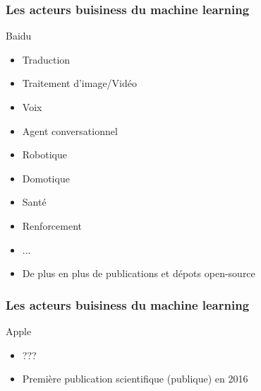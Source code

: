 \documentclass{formation}
\begin{document}
\begin{frame}
  \frametitle{Les acteurs buisiness du machine learning}
  Baidu
  \begin{itemize}
  \item Traduction
  \item Traitement d'image/Vidéo
  \item Voix
  \item Agent conversationnel
  \item Robotique
  \item Domotique
  \item Santé
  \item Renforcement
  \item ...
  \item De plus en plus de publications et dépots open-source
  \end{itemize}
\end{frame}

\begin{frame}
  \frametitle{Les acteurs buisiness du machine learning}
  Apple
  \begin{itemize}
  \item ???
  \item Première publication scientifique (publique) en 2016
  \end{itemize}
\end{frame}
\end{document}

